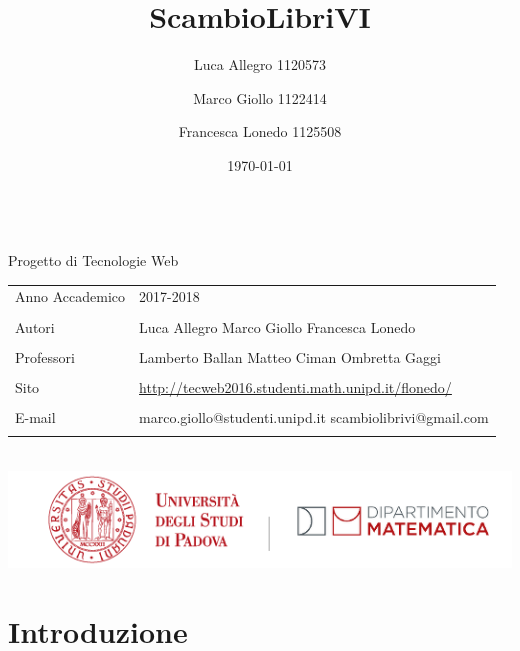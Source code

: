 \documentclass[openany,10pt,a4paper]{article}
\title{ScambioLibriVI}
\author{Luca Allegro 1120573 \and Marco Giollo 1122414 \and Francesca Lonedo 1125508}
\date{\today}
\begin{document}
	\makeatletter
	\begin{titlepage}
		\begin{center}
			

			{\Huge \bfseries  \@title }\\[5em]
			\vfill
			{\Large Progetto di Tecnologie Web} \\[2em]
			\begin{tabular}{ p{5cm} | p{5cm} }
				Anno Accademico & 2017-2018 \\
				\\
				Autori & Luca Allegro \newline Marco Giollo \newline Francesca Lonedo \\
				\\
				Professori & Lamberto Ballan \newline Matteo Ciman \newline Ombretta Gaggi  \\
				\\
				Sito & \url{http://tecweb2016.studenti.math.unipd.it/flonedo/} \\
				\\
				E-mail & marco.giollo@studenti.unipd.it \newline scambiolibrivi@gmail.com \\
				\\
			\end{tabular}\\[3 em]
			\vfill
			{\large \@date}
			\vfill
			\includegraphics[height=2 cm]{header_dipartimento_matematica.png}\\[3em]
		\end{center}
	\end{titlepage}


	
	


	\newpage

	\tableofcontents
	\newpage

\section{Introduzione}
\end{document}
